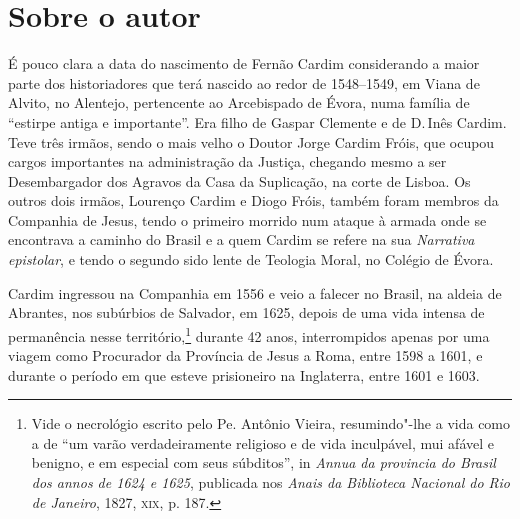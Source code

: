 \section{Sobre o autor}

É pouco clara a data do nascimento de Fernão Cardim considerando a
maior parte dos historiadores que terá nascido ao redor de 
1548--1549, em Viana de Alvito, no
Alentejo, pertencente ao Arcebispado de Évora, numa família de ``estirpe
antiga e importante''. Era filho de Gaspar
Clemente e de D.\,Inês Cardim. Teve três irmãos, sendo o mais velho o
Doutor Jorge Cardim Fróis, que ocupou cargos importantes na
administração da Justiça, chegando mesmo a ser Desembargador dos
Agravos da Casa da Suplicação, na corte de Lisboa. Os outros dois
irmãos, Lourenço Cardim e Diogo Fróis, também foram membros da
Companhia de Jesus, tendo o primeiro morrido num ataque à armada onde
se encontrava a caminho do Brasil e a quem Cardim se refere na sua
\textit{Narrativa epistolar}, e tendo o segundo sido lente de Teologia
Moral, no Colégio de Évora.

Cardim ingressou na Companhia em 1556 e veio a falecer no
Brasil, na aldeia de Abrantes, nos subúrbios de Salvador, em 1625,
depois de uma vida intensa de permanência nesse território,\footnote{ Vide 
o necrológio escrito pelo Pe. Antônio Vieira, resumindo"-lhe a
vida como a de ``um varão verdadeiramente religioso e de vida
inculpável, mui afável e benigno, e em especial com seus súbditos'', in
\textit{Annua da provincia do Brasil dos annos de 1624 e 1625}, 
publicada nos \textit{Anais da Biblioteca Nacional do Rio de Janeiro}, 
1827, \textsc{xix}, p. 187.} durante 42 anos, interrompidos
apenas por uma viagem como Procurador da Província de Jesus a Roma,
entre 1598 a 1601, e durante o período em que esteve prisioneiro na
Inglaterra, entre 1601 e 1603. 

